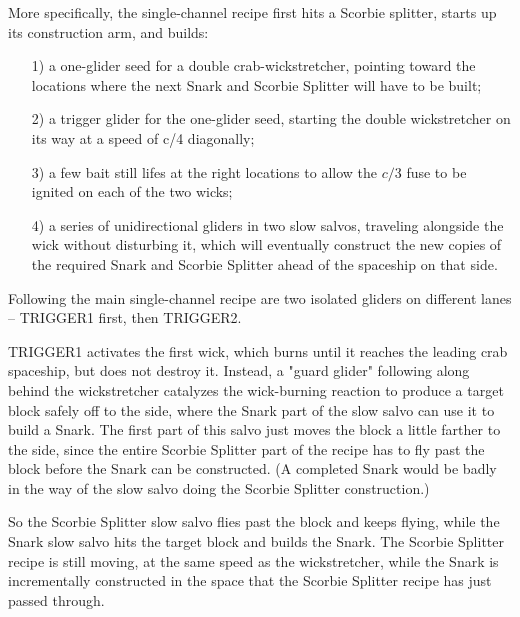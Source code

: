 
More specifically, the single-channel recipe first hits a Scorbie splitter, starts up its construction arm, and builds:\smallskip

\begin{itemize}
	\item[1)] a one-glider seed for a double crab-wickstretcher, pointing toward the locations where the next Snark and Scorbie Splitter will have to be built;\smallskip
	
	\item[2)] a trigger glider for the one-glider seed, starting the double wickstretcher on its way at a speed of c/4 diagonally;\smallskip%
	
	\item[3)] a few bait still lifes at the right locations to allow the $c/3$ fuse to be ignited on each of the two wicks;\smallskip
	
	\item[4)] a series of unidirectional gliders in two slow salvos, traveling alongside the wick without disturbing it, which will eventually construct the new copies of the required Snark and Scorbie Splitter ahead of the spaceship on that side.\smallskip
\end{itemize}

Following the main single-channel recipe are two isolated gliders on different lanes -- TRIGGER1 first, then TRIGGER2.

TRIGGER1 activates the first wick, which burns until it reaches the leading crab spaceship, but does not destroy it. Instead, a "guard glider" following along behind the wickstretcher catalyzes the wick-burning reaction to produce a target block safely off to the side, where the Snark part of the slow salvo can use it to build a Snark. The first part of this salvo just moves the block a little farther to the side, since the entire Scorbie Splitter part of the recipe has to fly past the block before the Snark can be constructed. (A completed Snark would be badly in the way of the slow salvo doing the Scorbie Splitter construction.)

So the Scorbie Splitter slow salvo flies past the block and keeps flying, while the Snark slow salvo hits the target block and builds the Snark. The Scorbie Splitter recipe is still moving, at the same speed as the wickstretcher, while the Snark is incrementally constructed in the space that the Scorbie Splitter recipe has just passed through.

